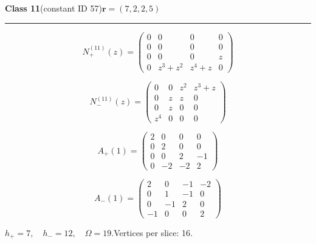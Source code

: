 \noindent\begin{minipage}{\linewidth}
\noindent\textbf{Class 11}\quad\small (constant ID 57)\hfill $\symbf{r}=(7,2,2,5)$
\par\smallskip\noindent\textcolor{rulegray}{\rule{\linewidth}{0.3pt}}
\begin{minipage}[c]{0.495\linewidth}\centering\fontsize{9.7}{12}\selectfont
\setlength{\abovedisplayskip}{4pt}\setlength{\belowdisplayskip}{4pt}
\setlength{\abovedisplayshortskip}{4pt}\setlength{\belowdisplayshortskip}{4pt}
\setlength{\arraycolsep}{3pt}\renewcommand{\arraystretch}{1.08}
\[N_{+}^{(11)}(z)=\begin{pmatrix}0 & 0 & 0 & 0\\0 & 0 & 0 & 0\\0 & 0 & 0 & z\\0 & z^{3} + z^{2} & z^{4} + z & 0\end{pmatrix}\]
\end{minipage}%
\begin{minipage}[c]{0.495\linewidth}\centering\fontsize{9.7}{12}\selectfont
\setlength{\abovedisplayskip}{4pt}\setlength{\belowdisplayskip}{4pt}
\setlength{\abovedisplayshortskip}{4pt}\setlength{\belowdisplayshortskip}{4pt}
\setlength{\arraycolsep}{3pt}\renewcommand{\arraystretch}{1.08}
\[N_{-}^{(11)}(z)=\begin{pmatrix}0 & 0 & z^{2} & z^{3} + z\\0 & z & z & 0\\0 & z & 0 & 0\\z^{4} & 0 & 0 & 0\end{pmatrix}\]
\end{minipage}%
\par\noindent
\begin{minipage}[c]{0.495\linewidth}\centering\fontsize{9.7}{12}\selectfont
\setlength{\abovedisplayskip}{4pt}\setlength{\belowdisplayskip}{4pt}
\setlength{\abovedisplayshortskip}{4pt}\setlength{\belowdisplayshortskip}{4pt}
\setlength{\arraycolsep}{3pt}\renewcommand{\arraystretch}{1.08}
\[A_{+}(1)=\begin{pmatrix}2 & 0 & 0 & 0\\0 & 2 & 0 & 0\\0 & 0 & 2 & -1\\0 & -2 & -2 & 2\end{pmatrix}\]
\end{minipage}%
\begin{minipage}[c]{0.495\linewidth}\centering\fontsize{9.7}{12}\selectfont
\setlength{\abovedisplayskip}{4pt}\setlength{\belowdisplayskip}{4pt}
\setlength{\abovedisplayshortskip}{4pt}\setlength{\belowdisplayshortskip}{4pt}
\setlength{\arraycolsep}{3pt}\renewcommand{\arraystretch}{1.08}
\[A_{-}(1)=\begin{pmatrix}2 & 0 & -1 & -2\\0 & 1 & -1 & 0\\0 & -1 & 2 & 0\\-1 & 0 & 0 & 2\end{pmatrix}\]
\end{minipage}%
\par\smallskip\noindent\small $h_+=7,\quad h_-=12,\quad \Omega=19.$\quad Vertices per slice: 16.
\end{minipage}\par\vfill
\clearpage

